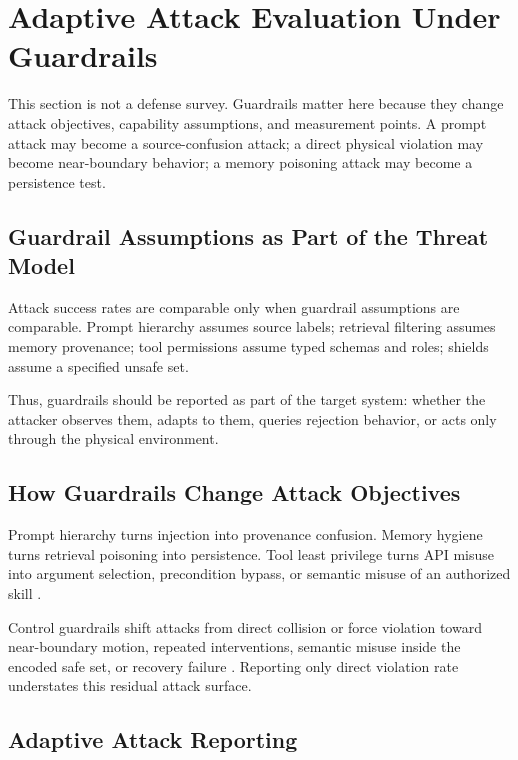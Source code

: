 \section{Adaptive Attack Evaluation Under Guardrails}
\label{sec:defense}

This section is not a defense survey. Guardrails matter here because they change attack objectives, capability assumptions, and measurement points. A prompt attack may become a source-confusion attack; a direct physical violation may become near-boundary behavior; a memory poisoning attack may become a persistence test.

\subsection{Guardrail Assumptions as Part of the Threat Model}

Attack success rates are comparable only when guardrail assumptions are comparable. Prompt hierarchy assumes source labels; retrieval filtering assumes memory provenance; tool permissions assume typed schemas and roles; shields assume a specified unsafe set.

Thus, guardrails should be reported as part of the target system: whether the attacker observes them, adapts to them, queries rejection behavior, or acts only through the physical environment.

\subsection{How Guardrails Change Attack Objectives}

Prompt hierarchy turns injection into provenance confusion. Memory hygiene turns retrieval poisoning into persistence. Tool least privilege turns API misuse into argument selection, precondition bypass, or semantic misuse of an authorized skill \cite{greshake2023not,zhan2024injecagent,debenedetti2024agentdojo}.

Control guardrails shift attacks from direct collision or force violation toward near-boundary motion, repeated interventions, semantic misuse inside the encoded safe set, or recovery failure \cite{ames2017control,alshiekh2018shielded,achiam2017constrained,dawson2023safecontrol,zhang2025safevla}. Reporting only direct violation rate understates this residual attack surface.

\subsection{Adaptive Attack Reporting}

